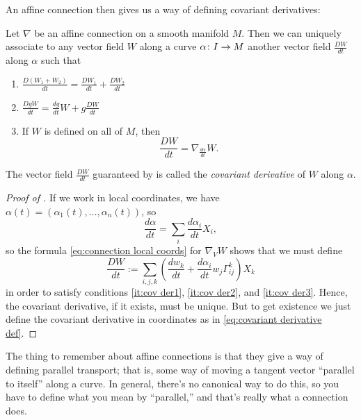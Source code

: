 An affine connection then gives us a way of defining covariant derivatives:

\begin{proposition}\label{prop:covariant derivative}
	Let $\nabla$ be an affine connection on a smooth manifold $M$. Then we can uniquely associate to any vector field $W$ along a curve $\alpha \colon\thinspace\! I \to M$ another vector field $\frac{DW}{dt}$ along $\alpha$ such that
	\begin{enumerate}
		\item \label{it:cov der1} $\frac{D(W_1 + W_2)}{dt} = \frac{DW_1}{dt} + \frac{DW_2}{dt}$
		\item \label{it:cov der2} $\frac{DgW}{dt} = \frac{dg}{dt} W + g \frac{DW}{dt}$
		\item \label{it:cov der3} If $W$ is defined on all of $M$, then
		\[
			\frac{DW}{dt} = \nabla_{\frac{d\alpha}{dt}} W.
		\]
	\end{enumerate}
\end{proposition}

\begin{definition}\label{def:covariant derivative}
	The vector field $\frac{DW}{dt}$ guaranteed by  is called the \emph{covariant derivative} of $W$ along $\alpha$.
\end{definition}

\begin{proof}[Proof of ]
	If we work in local coordinates, we have $\alpha(t) = (\alpha_1(t), \dots , \alpha_n(t))$, so
	\[
		\frac{d\alpha}{dt} = \sum_i \frac{d\alpha_i}{dt} X_i,
	\]
	so the formula \eqref{eq:connection local coords} for $\nabla_VW$ shows that we must define
	\begin{equation}\label{eq:covariant derivative def}
		\frac{DW}{dt} := \sum_{i,j,k} \left( \frac{dw_k}{dt} + \frac{d\alpha_i}{dt} w_j \Gamma_{ij}^k \right)X_k
	\end{equation}
	in order to satisfy conditions \ref{it:cov der1}, \ref{it:cov der2}, and \ref{it:cov der3}. Hence, the covariant derivative, if it exists, must  be unique. But to get existence we just define the covariant derivative in coordinates as in \eqref{eq:covariant derivative def}.
\end{proof}

The thing to remember about affine connections is that they give a way of defining parallel transport; that is, some way of moving a tangent vector ``parallel to itself'' along a curve. In general, there's no canonical way to do this, so you have to define what you mean by ``parallel,'' and that's really what a connection does.

